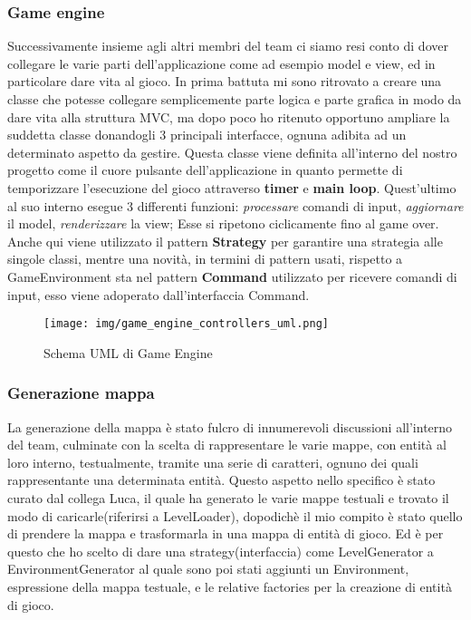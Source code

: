 \subsubsection{Game engine}
Successivamente insieme agli altri membri del team ci siamo resi conto di dover collegare le varie parti dell'applicazione come ad esempio model e view, ed in particolare dare vita al gioco.
In prima battuta mi sono ritrovato a creare una classe che potesse collegare semplicemente parte logica e parte grafica in modo da dare vita alla struttura MVC, ma dopo poco ho ritenuto opportuno ampliare la suddetta classe donandogli 3 principali interfacce, ognuna adibita ad un determinato aspetto da gestire.
Questa classe viene definita all'interno del nostro progetto come il cuore pulsante dell'applicazione in quanto permette di temporizzare l'esecuzione del gioco attraverso \textbf{timer} e \textbf{main loop}.
Quest'ultimo al suo interno esegue 3 differenti funzioni: \textit{processare} comandi di input, \textit{aggiornare} il model, \textit{renderizzare} la view; Esse si ripetono ciclicamente fino al game over.
Anche qui viene utilizzato il pattern \textbf{Strategy} per garantire una strategia alle singole classi, mentre una novità, in termini di pattern usati, rispetto a GameEnvironment sta nel pattern \textbf{Command} utilizzato per ricevere comandi di input, esso viene adoperato dall'interfaccia Command.

\begin{figure}[H]
	\centering{}
	\texttt{[image: img/game\_engine\_controllers\_uml.png]}
	\label{img:game_engine_controllers_uml.png}
	\caption{Schema UML di Game Engine\\}
\end{figure}

\subsubsection{Generazione mappa}
La generazione della mappa è stato fulcro di innumerevoli discussioni all'interno del team, culminate con la scelta di rappresentare le varie mappe, con entità al loro interno, testualmente, tramite una serie di caratteri, ognuno dei quali rappresentante una determinata entità.
Questo aspetto nello specifico è stato curato dal collega Luca, il quale ha generato le varie mappe testuali e trovato il modo di caricarle(riferirsi a LevelLoader), dopodichè il mio compito è stato quello di prendere la mappa e trasformarla in una mappa di entità di gioco.
Ed è per questo che ho scelto di dare una strategy(interfaccia) come LevelGenerator a EnvironmentGenerator al quale sono poi stati aggiunti un Environment, espressione della mappa testuale, e le relative factories per la creazione di entità di gioco.

